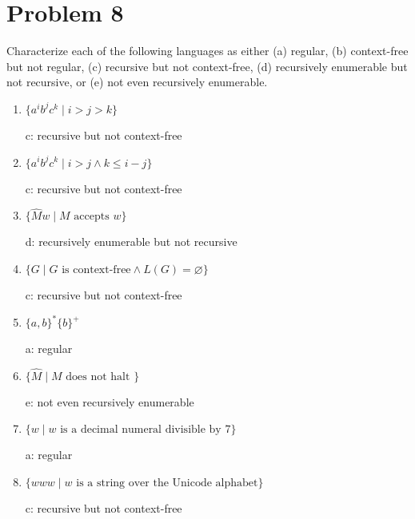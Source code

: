 \documentclass{article}
\begin{document}
\section*{Problem 8}
Characterize each of the following languages as either (a) regular, (b) context-free but not regular, (c) recursive but not context-free, (d) recursively enumerable but not recursive, or (e) not even recursively enumerable.
\begin{enumerate}[label=(\alph*)]
  \item $\{ a^ib^jc^k \mid i > j > k \}$
    \begin{shaded}
      c: recursive but not context-free
    \end{shaded}

  \item $\{ a^ib^jc^k \mid i > j \wedge k \leq i-j \}$
    \begin{shaded}
      c: recursive but not context-free
    \end{shaded}

  \item $\{ \hat{M}w \mid M \textrm{ accepts } w\}$
    \begin{shaded}
      d: recursively enumerable but not recursive
    \end{shaded}

  \item $\{ G \mid G \textrm{ is context-free} \wedge L(G)=\varnothing \}$
    \begin{shaded}
      c: recursive but not context-free
    \end{shaded}

  \item $\{ a,b \}^*\{b\}^+$
    \begin{shaded}
      a: regular
    \end{shaded}

  \item $\{ \hat{M} \mid M \textrm{ does not halt }\}$
    \begin{shaded}
      e: not even recursively enumerable
    \end{shaded}

  \item $\{ w \mid w \textrm{ is a decimal numeral divisible by 7} \}$
    \begin{shaded}
      a: regular
    \end{shaded}

  \item $\{ www \mid w \textrm{ is a string over the Unicode alphabet} \}$
    \begin{shaded}
      c: recursive but not context-free
    \end{shaded}

\end{enumerate}
\end{document}
